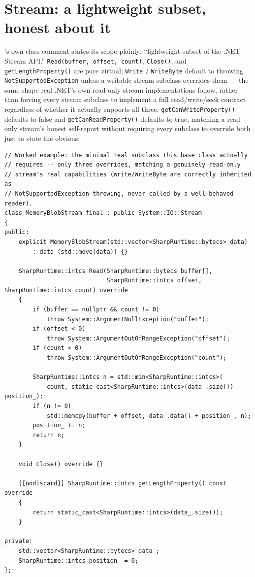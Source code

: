 \section{Stream: a lightweight subset, honest about it}

's own class comment states its scope plainly: ``lightweight subset of
the .NET Stream API.'' \texttt{Read(buffer, offset, count)}, \texttt{Close()}, and
\texttt{getLengthProperty()} are pure virtual; \texttt{Write} / \texttt{WriteByte} default to
throwing \texttt{NotSupportedException} unless a writable stream subclass overrides them ---
the same shape real .NET's own read-only stream implementations follow, rather than forcing
every stream subclass to implement a full read/write/seek contract regardless of whether it
actually supports all three. \texttt{getCanWriteProperty()} defaults to false and
\texttt{getCanReadProperty()} defaults to true, matching a read-only stream's honest self-report
without requiring every subclass to override both just to state the obvious.

\begin{lstlisting}
// Worked example: the minimal real subclass this base class actually
// requires -- only three overrides, matching a genuinely read-only
// stream's real capabilities (Write/WriteByte are correctly inherited as
// NotSupportedException-throwing, never called by a well-behaved reader).
class MemoryBlobStream final : public System::IO::Stream
{
public:
    explicit MemoryBlobStream(std::vector<SharpRuntime::bytecs> data)
        : data_(std::move(data)) {}

    SharpRuntime::intcs Read(SharpRuntime::bytecs buffer[],
                             SharpRuntime::intcs offset, SharpRuntime::intcs count) override
    {
        if (buffer == nullptr && count != 0)
            throw System::ArgumentNullException("buffer");
        if (offset < 0)
            throw System::ArgumentOutOfRangeException("offset");
        if (count < 0)
            throw System::ArgumentOutOfRangeException("count");

        SharpRuntime::intcs n = std::min<SharpRuntime::intcs>(
            count, static_cast<SharpRuntime::intcs>(data_.size()) - position_);
        if (n != 0)
            std::memcpy(buffer + offset, data_.data() + position_, n);
        position_ += n;
        return n;
    }

    void Close() override {}

    [[nodiscard]] SharpRuntime::intcs getLengthProperty() const override
    {
        return static_cast<SharpRuntime::intcs>(data_.size());
    }

private:
    std::vector<SharpRuntime::bytecs> data_;
    SharpRuntime::intcs position_ = 0;
};
\end{lstlisting}

